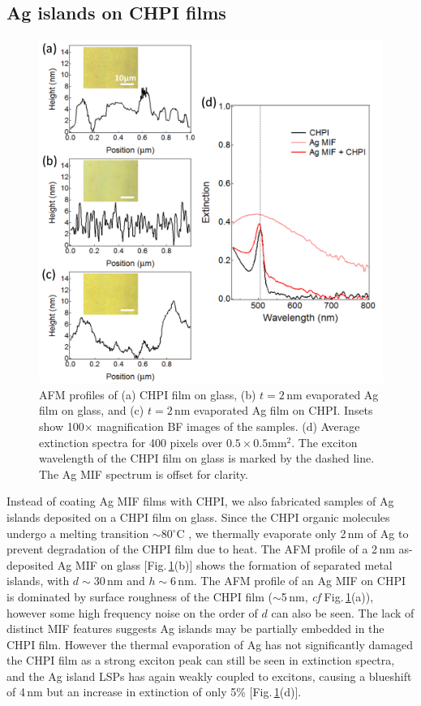 \subsection{Ag islands on CHPI films}
\label{sec:AgonCHPI}
\begin{figure}[h!] 
\centering    
\includegraphics[width=\textwidth]{Fig8}
\caption{AFM profiles of (a) CHPI film on glass, (b) $t=2$\,nm evaporated Ag film on glass, and (c) $t=2$\,nm evaporated Ag film on CHPI. Insets show 100$\times$ magnification BF images of the samples. (d) Average extinction spectra for 400 pixels over $0.5\times0.5$mm$^2$. The exciton wavelength of the CHPI film on glass is marked by the dashed line. The Ag MIF spectrum is offset for clarity.}
\label{6Fig8}
\end{figure}
Instead of coating Ag MIF films with CHPI, we also fabricated samples of Ag islands deposited on a CHPI film on glass. Since the CHPI organic molecules undergo a melting transition $\sim$80$^{\circ}$C \cite{Barman2003}, we thermally evaporate only 2\,nm of Ag to prevent degradation of the CHPI film due to heat. The AFM profile of a 2\,nm as-deposited Ag MIF on glass [Fig.\,\ref{6Fig8}(b)] shows the formation of separated metal islands, with $d\sim30$\,nm and $h\sim6$\,nm. The AFM profile of an Ag MIF on CHPI is dominated by surface roughness of the CHPI film ($\sim$5\,nm, \textit{cf} Fig.\,\ref{6Fig8}(a)), however some high frequency noise on the order of $d$ can also be seen. The lack of distinct MIF features suggests Ag islands may be partially embedded in the CHPI film. However the thermal evaporation of Ag has not significantly damaged the CHPI film as a strong exciton peak can still be seen in extinction spectra, and the Ag island LSPs has again weakly coupled to excitons, causing a blueshift of 4\,nm but an increase in extinction of only 5\% [Fig.\,\ref{6Fig8}(d)].


